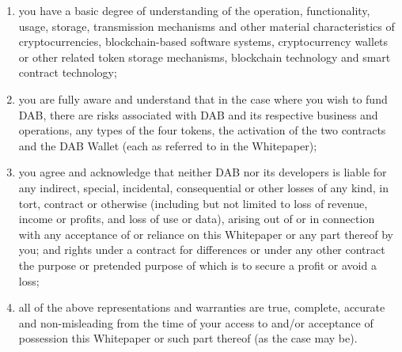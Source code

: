 \documentclass[review]{elsarticle}
\begin{document}
\begin{enumerate}
   \item you have a basic degree of understanding of the operation, functionality, usage, storage, transmission mechanisms and other material characteristics of cryptocurrencies, blockchain-based software systems, cryptocurrency wallets or other related token storage mechanisms, blockchain technology and smart contract technology;
   \item you are fully aware and understand that in the case where you wish to fund DAB, there are risks associated with DAB and its respective business and operations, any types of the four tokens, the activation of the two contracts and the DAB Wallet (each as referred to in the Whitepaper);
   \item you agree and acknowledge that neither DAB nor its developers is liable for any indirect, special, incidental, consequential or other losses of any kind, in tort, contract or otherwise (including but not limited to loss of revenue, income or profits, and loss of use or data), arising out of or in connection with any acceptance of or reliance on this Whitepaper or any part thereof by you; and rights under a contract for differences or under any other contract the purpose or pretended purpose of which is to secure a profit or avoid a loss;
   \item all of the above representations and warranties are true, complete, accurate and non-misleading from the time of your access to and/or acceptance of possession this Whitepaper or such part thereof (as the case may be).
\end{enumerate}
\end{document}
